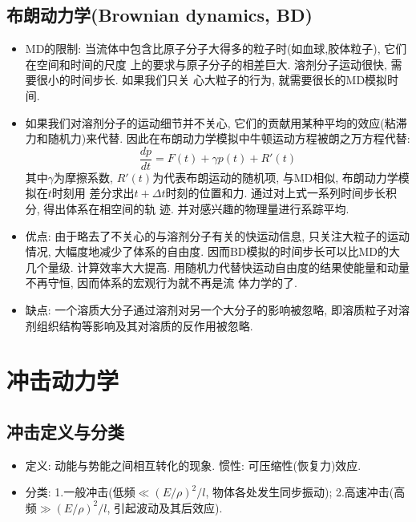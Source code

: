 \documentclass[a4paper,titlepage,twocolumn]{article}
\begin{document}
\subsection{布朗动力学(Brownian dynamics, BD)}
\begin{itemize}
\item MD的限制: 当流体中包含比原子分子大得多的粒子时(如血球,胶体粒子), 它们在空间和时间的尺度
上的要求与原子分子的相差巨大. 溶剂分子运动很快, 需要很小的时间步长. 如果我们只关
心大粒子的行为, 就需要很长的MD模拟时间. 

\item 如果我们对溶剂分子的运动细节并不关心, 它们的贡献用某种平均的效应(粘滞力和随机力)来代替. 因此在布朗动力学模拟中牛顿运动方程被朗之万方程代替:
\[
\frac{dp}{dt} = F(t)+\gamma p(t) + R'(t)
\]
其中$\gamma$为摩擦系数, $R'(t)$为代表布朗运动的随机项, 与MD相似, 布朗动力学模拟在$t$时刻用
差分求出$t+\Delta t$时刻的位置和力. 通过对上式一系列时间步长积分, 得出体系在相空间的轨
迹. 并对感兴趣的物理量进行系踪平均.

\item 优点: 由于略去了不关心的与溶剂分子有关的快运动信息, 只关注大粒子的运动情况,
大幅度地减少了体系的自由度. 因而BD模拟的时间步长可以比MD的大几个量级.
计算效率大大提高. 用随机力代替快运动自由度的结果使能量和动量不再守恒, 因而体系的宏观行为就不再是流
体力学的了.

\item 缺点: 一个溶质大分子通过溶剂对另一个大分子的影响被忽略, 即溶质粒子对溶剂组织结构等影响及其对溶质的反作用被忽略.
\end{itemize}


\section{冲击动力学}
\subsection{冲击定义与分类}
\begin{itemize}
\item 定义: 动能与势能之间相互转化的现象. 惯性: 可压缩性(恢复力)效应.
\item 分类: 1.一般冲击(低频$\ll (E/\rho)^2/l$, 物体各处发生同步振动); 2.高速冲击(高频$\gg (E/\rho)^2/l$, 引起波动及其后效应).
\end{itemize}
\end{document}
